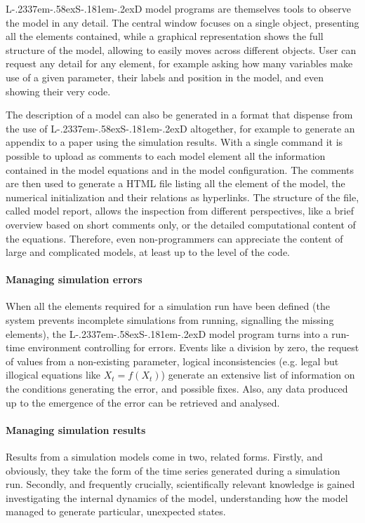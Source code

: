 \documentclass [11pt,a4paper] {book}
\def\LsD{{L\kern-.2337em\lower-.58ex\hbox{S}\kern-.181em\lower-.2ex\hbox{D}}\xspace}
\begin{document}
\LsD model programs are themselves tools to observe the model in any detail. The central window focuses on a single object, presenting all the elements contained, while a graphical representation shows the full structure of the model, allowing to easily moves across different objects. User can request any detail for any element, for example asking how many variables make use of a given parameter, their labels and position in the model, and even showing their very code.

The description of a model can also be generated in a format that dispense from the use of \LsD altogether, for example to generate an appendix to a paper using the simulation results. With a single command it is possible to upload as comments to each model element all the information contained in the model equations and in the model configuration. The comments are then used to generate a HTML file listing all the element of the model, the numerical initialization and their relations as hyperlinks. The structure of the file, called model report, allows the inspection from different perspectives, like a brief overview based on short comments only, or the detailed computational content of the equations. Therefore, even non-programmers can appreciate the content of large and complicated models, at least up to the level of the code.

\paragraph{Managing simulation errors}
When all the elements required for a simulation run have been defined (the system prevents incomplete simulations from running, signalling the missing elements), the \LsD model program turns into a run-time environment controlling for errors. Events like a division by zero, the request of values from a non-existing parameter, logical inconsistencies (e.g. legal but illogical equations like $X_t=f(X_t)$) generate an extensive list of information on the conditions generating the error, and possible fixes. Also, any data produced up to the emergence of the error can be retrieved and analysed.


\paragraph{Managing simulation results}
Results from a simulation models come in two, related forms. Firstly, and obviously, they take the form of the time series generated during a simulation run. Secondly, and frequently crucially, scientifically relevant knowledge is gained investigating the internal dynamics of the model, understanding how the model managed to generate particular, unexpected states.
\end{document}
